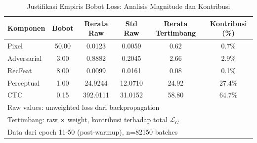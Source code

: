 
\begin{table}[!t]
\renewcommand{\arraystretch}{1.3}
\caption{Justifikasi Empiris Bobot Loss: Analisis Magnitude dan Kontribusi}
\label{table:loss_weights_justification}
\centering
\footnotesize
\begin{tabular}{|l|c|c|c|c|c|}
\hline
\textbf{Komponen} & \textbf{Bobot} & \textbf{Rerata Raw} & \textbf{Std Raw} & \textbf{Rerata Tertimbang} & \textbf{Kontribusi (\%)} \\
\hline
Pixel & 50.00 & 0.0123 & 0.0059 & 0.62 & 0.7\% \\
Adversarial & 3.00 & 0.8882 & 0.2045 & 2.66 & 2.9\% \\
RecFeat & 8.00 & 0.0099 & 0.0161 & 0.08 & 0.1\% \\
Perceptual & 1.00 & 24.9244 & 12.0710 & 24.92 & 27.4\% \\
CTC & 0.15 & 392.0111 & 31.0152 & 58.80 & 64.7\% \\
\hline
\multicolumn{6}{|l|}{\footnotesize Raw values: unweighted loss dari backpropagation} \\
\multicolumn{6}{|l|}{\footnotesize Tertimbang: raw $\times$ weight, kontribusi terhadap total $\mathcal{{L}}_G$} \\
\multicolumn{6}{|l|}{\footnotesize Data dari epoch 11-50 (post-warmup), n=82150 batches} \\
\end{tabular}
\end{table}
